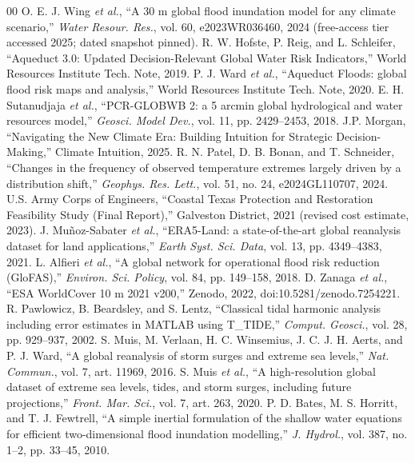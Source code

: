 \documentclass[conference]{IEEEtran}
\begin{document}
\begin{thebibliography}{00}
 O. E. J. Wing \emph{et al.}, ``A 30 m global flood inundation model for any climate scenario,'' \emph{Water Resour. Res.}, vol. 60, e2023WR036460, 2024 (free-access tier accessed 2025; dated snapshot pinned).
 R. W. Hofste, P. Reig, and L. Schleifer, ``Aqueduct 3.0: Updated Decision-Relevant Global Water Risk Indicators,'' World Resources Institute Tech. Note, 2019.
 P. J. Ward \emph{et al.}, ``Aqueduct Floods: global flood risk maps and analysis,'' World Resources Institute Tech. Note, 2020.
 E. H. Sutanudjaja \emph{et al.}, ``PCR-GLOBWB 2: a 5 arcmin global hydrological and water resources model,'' \emph{Geosci. Model Dev.}, vol. 11, pp. 2429--2453, 2018.
 J.P. Morgan, ``Navigating the New Climate Era: Building Intuition for Strategic Decision-Making,'' Climate Intuition, 2025.
 R. N. Patel, D. B. Bonan, and T. Schneider, ``Changes in the frequency of observed temperature extremes largely driven by a distribution shift,'' \emph{Geophys. Res. Lett.}, vol. 51, no. 24, e2024GL110707, 2024.
 U.S. Army Corps of Engineers, ``Coastal Texas Protection and Restoration Feasibility Study (Final Report),'' Galveston District, 2021 (revised cost estimate, 2023).
 J. Mu\~noz-Sabater \emph{et al.}, ``ERA5-Land: a state-of-the-art global reanalysis dataset for land applications,'' \emph{Earth Syst. Sci. Data}, vol. 13, pp. 4349--4383, 2021.
 L. Alfieri \emph{et al.}, ``A global network for operational flood risk reduction (GloFAS),'' \emph{Environ. Sci. Policy}, vol. 84, pp. 149--158, 2018.
 D. Zanaga \emph{et al.}, ``ESA WorldCover 10 m 2021 v200,'' Zenodo, 2022, doi:10.5281/zenodo.7254221.
 R. Pawlowicz, B. Beardsley, and S. Lentz, ``Classical tidal harmonic analysis including error estimates in MATLAB using T\_TIDE,'' \emph{Comput. Geosci.}, vol. 28, pp. 929--937, 2002.
 S. Muis, M. Verlaan, H. C. Winsemius, J. C. J. H. Aerts, and P. J. Ward, ``A global reanalysis of storm surges and extreme sea levels,'' \emph{Nat. Commun.}, vol. 7, art. 11969, 2016.
 S. Muis \emph{et al.}, ``A high-resolution global dataset of extreme sea levels, tides, and storm surges, including future projections,'' \emph{Front. Mar. Sci.}, vol. 7, art. 263, 2020.
 P. D. Bates, M. S. Horritt, and T. J. Fewtrell, ``A simple inertial formulation of the shallow water equations for efficient two-dimensional flood inundation modelling,'' \emph{J. Hydrol.}, vol. 387, no. 1--2, pp. 33--45, 2010.

\end{thebibliography}
\end{document}
